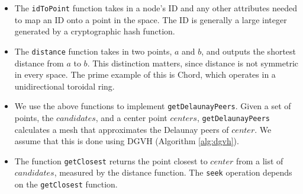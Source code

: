 \begin{itemize}

\item The \texttt{idToPoint} function takes in a node's ID and any other attributes needed to map an ID onto a point in the space.
The ID is generally a large integer generated by a cryptographic hash function.


\item The \texttt{distance} function takes in two points, $a$ and $b$, and outputs the shortest distance from $a$ to $b$.
This distinction matters, since distance is not symmetric in every space.
The prime example of this is Chord, which operates in a unidirectional toroidal ring.




\item We use the above functions to implement \texttt{getDelaunayPeers}.
Given a set of points, the $ candidates$, and a center point $ centers$, \texttt{getDelaunayPeers} calculates a mesh that approximates the Delaunay peers of $ center$.
We assume that this is done using DGVH (Algorithm \ref{alg:dgvh}).



\item The function \texttt{getClosest} returns the point closest to $ center$ from a list of $ candidates$, measured by the distance function.
The \texttt{seek} operation depends on the \texttt{getClosest} function.



\end{itemize}
